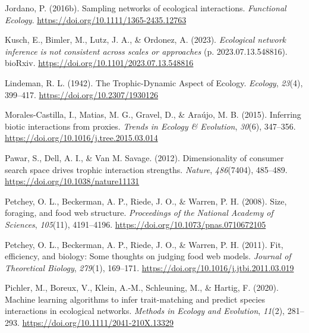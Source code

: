 \documentclass[
]{article}
\newlength{\cslhangindent}
\newenvironment{CSLReferences}[2] %
 {\begin{list}{}{%
  \setlength{\itemindent}{0pt}
  \setlength{\leftmargin}{0pt}
  \setlength{\parsep}{0pt}
  \ifodd #1
   \setlength{\leftmargin}{\cslhangindent}
   \setlength{\itemindent}{-1\cslhangindent}
  \fi
  \setlength{\itemsep}{#2\baselineskip}}}
 {\end{list}}
\begin{document}
\begin{CSLReferences}{1}{0}
Jordano, P. (2016b). Sampling networks of ecological interactions.
\emph{Functional Ecology}. \url{https://doi.org/10.1111/1365-2435.12763}

Kusch, E., Bimler, M., Lutz, J. A., \& Ordonez, A. (2023).
\emph{Ecological network inference is not consistent across scales or
approaches} (p. 2023.07.13.548816). bioRxiv.
\url{https://doi.org/10.1101/2023.07.13.548816}

Lindeman, R. L. (1942). The {Trophic-Dynamic Aspect} of {Ecology}.
\emph{Ecology}, \emph{23}(4), 399--417.
\url{https://doi.org/10.2307/1930126}

Morales-Castilla, I., Matias, M. G., Gravel, D., \& Araújo, M. B.
(2015). Inferring biotic interactions from proxies. \emph{Trends in
Ecology \& Evolution}, \emph{30}(6), 347--356.
\url{https://doi.org/10.1016/j.tree.2015.03.014}

Pawar, S., Dell, A. I., \& Van M. Savage. (2012). Dimensionality of
consumer search space drives trophic interaction strengths.
\emph{Nature}, \emph{486}(7404), 485--489.
\url{https://doi.org/10.1038/nature11131}

Petchey, O. L., Beckerman, A. P., Riede, J. O., \& Warren, P. H. (2008).
Size, foraging, and food web structure. \emph{Proceedings of the
National Academy of Sciences}, \emph{105}(11), 4191--4196.
\url{https://doi.org/10.1073/pnas.0710672105}

Petchey, O. L., Beckerman, A. P., Riede, J. O., \& Warren, P. H. (2011).
Fit, efficiency, and biology: {Some} thoughts on judging food web
models. \emph{Journal of Theoretical Biology}, \emph{279}(1), 169--171.
\url{https://doi.org/10.1016/j.jtbi.2011.03.019}

Pichler, M., Boreux, V., Klein, A.-M., Schleuning, M., \& Hartig, F.
(2020). Machine learning algorithms to infer trait-matching and predict
species interactions in ecological networks. \emph{Methods in Ecology
and Evolution}, \emph{11}(2), 281--293.
\url{https://doi.org/10.1111/2041-210X.13329}


\end{CSLReferences}
\end{document}
